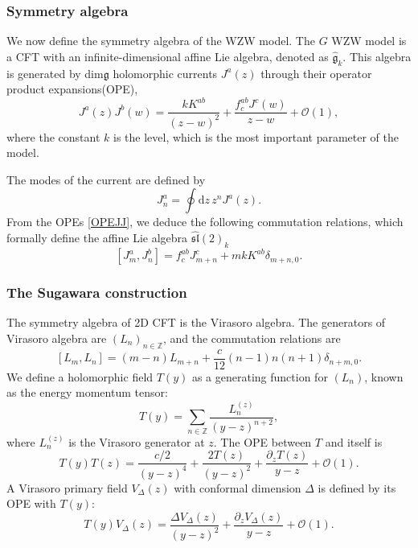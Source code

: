 \documentclass[10pt,a4paper]{article}
\numberwithin{equation}{section}
\begin{document}
\subsubsection*{Symmetry algebra}
We now define the symmetry algebra of the WZW model. 
The $G$ WZW model is a CFT with an infinite-dimensional affine Lie algebra, denoted as $\hat{\mathfrak{g}}_{k}$. 
This algebra is generated by dim$\mathfrak{g}$ holomorphic currents $J^{a}(z)$ through their operator product expansions(OPE), 
\begin{equation}
    \boxed{
        J^{a}(z)J^{b}(w) = \frac{kK^{ab}}{(z-w)^{2}} + \frac{f^{ab}_{c} J^{c}(w)}{z-w} + \mathcal{O}(1), \label{OPEJJ}
        }
\end{equation}
where the constant $k$ is the level, which is the most important parameter of the model. 

The modes of the current are defined by 
\begin{equation}
    J^{a}_{n} = \oint \mathrm{d}z \, z^{n} J^{a}(z).
\end{equation}
From the OPEs \eqref{OPEJJ}, we deduce the following commutation relations, 
which formally define the affine Lie algebra $\widehat{\mathfrak{sl}}(2)_{k}$
\begin{equation}
    \boxed{
        \left[ J^{a}_{m}, J^{b}_{n} \right] = f^{ab}_{c} J^{c}_{m+n} + m k K^{ab} \delta_{m+n,0}. \label{CR1}
    }
\end{equation}

\subsubsection*{The Sugawara construction}
The symmetry algebra of 2D CFT is the Virasoro algebra. The generators of Virasoro algebra are $\left(L_{n}\right)_{n \in \mathbb{Z}}$, and 
the commutation relations are 
\begin{equation}
    \boxed{
        \left[L_{m},L_{n}\right] = (m-n)L_{m+n} + \frac{c}{12} (n-1)n(n+1) \delta_{n+m,0}.
    }
\end{equation}
We define a holomorphic field $T(y)$ as a generating function for $\left(L_{n}\right)$, known as the energy momentum tensor:
\begin{equation}
    T(y) = \sum_{n\in \mathbb{Z}} \frac{L_{n}^{(z)}}{(y-z)^{n+2}},
\end{equation}
where $L_{n}^{(z)}$ is the Virasoro generator at $z$. The OPE between $T$ and itself is 
\begin{equation}
    T(y) T(z) = \frac{c/2}{(y-z)^{4}} + \frac{2 T(z)}{(y-z)^{2}} + \frac{\partial_{z} T(z)}{y-z} + \mathcal{O}(1).
\end{equation}
A Virasoro primary field $V_{\Delta}(z)$ with conformal dimension $\Delta$ is defined by its OPE with $T(y)$: 
\begin{equation}
    T(y) V_{\Delta}(z) = \frac{\Delta V_{\Delta}(z)}{(y-z)^{2}} + \frac{\partial_{z} V_{\Delta}(z)}{y-z} + \mathcal{O}(1).
\end{equation}
\end{document}
